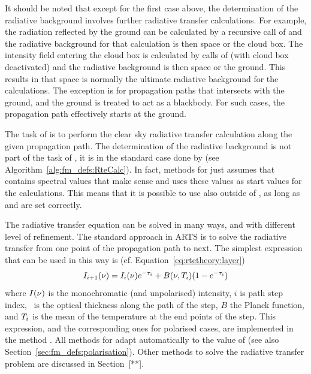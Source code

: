 It should be noted that except for the first case above, the
determination of the radiative background involves further radiative
transfer calculations. For example, the radiation reflected by the
ground can be calculated by a recursive call of 
and the radiative background for that calculation is then space or the
cloud box. The intensity field entering the cloud box is calculated by
calls of  (with cloud box deactivated) and the
radiative background is then space or the ground. This results in that
space is normally the ultimate radiative background for the
calculations. The exception is for propagation paths that intersects
with the ground, and the ground is treated to act as a blackbody. For
such cases, the propagation path effectively starts at the ground.


\label{sec:fm_defs:rte_agenda}

The task of  is to perform the clear sky
radiative transfer calculation along the given propagation path. The
determination of the radiative background is not part of the task of
, it is in the standard case done by
 (see Algorithm~\ref{alg:fm_defs:RteCalc}). In
fact, methods for  just assumes that
 contains spectral values that make sense and uses
these values as start values for the calculations. This means that it
is possible to use  also outside of
, as long as  and
 are set correctly.

The radiative transfer equation can be solved in many ways, and with
different level of refinement. The standard approach in ARTS is to
solve the radiative transfer from one point of the propagation path to
next. The simplest expression that can be used in this way is (cf.
Equation~\ref{eq:rtetheory:layer})
\begin{equation}
  I_{i+1}(\nu) = I_i(\nu)e^{-\tau_{i}} + B(\nu,T_{i})(1-e^{-\tau_{i}})
  \label{eq:fm_defs:rte_step}
\end{equation}
where $I(\nu)$ is the monochromatic (and unpolarised) intensity,
$i$ is path step index, \Oth\ is the optical thickness along the path
of the step, $B$ the Planck function, and $T_{i}$ is the mean of
the temperature at the end points of the step. This expression, and
the corresponding ones for polarised cases, are implemented in the
method . All methods for
 adapt automatically to the value of
 (see also Section~\ref{sec:fm_defs:polarisation}). 
Other methods to solve the radiative transfer problem are discussed in
Section~[**].



